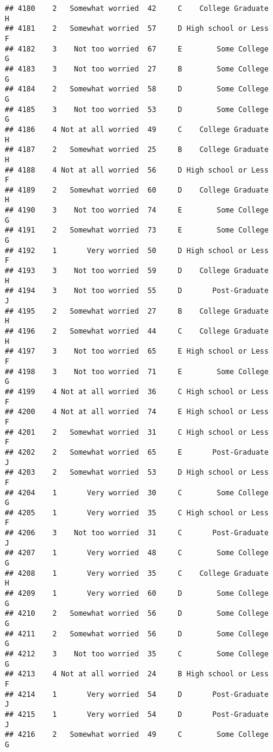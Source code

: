 \documentclass[
]{article}
\begin{document}
\begin{verbatim}
## 4180    2   Somewhat worried  42     C    College Graduate         H
## 4181    2   Somewhat worried  57     D High school or Less         F
## 4182    3    Not too worried  67     E        Some College         G
## 4183    3    Not too worried  27     B        Some College         G
## 4184    2   Somewhat worried  58     D        Some College         G
## 4185    3    Not too worried  53     D        Some College         G
## 4186    4 Not at all worried  49     C    College Graduate         H
## 4187    2   Somewhat worried  25     B    College Graduate         H
## 4188    4 Not at all worried  56     D High school or Less         F
## 4189    2   Somewhat worried  60     D    College Graduate         H
## 4190    3    Not too worried  74     E        Some College         G
## 4191    2   Somewhat worried  73     E        Some College         G
## 4192    1       Very worried  50     D High school or Less         F
## 4193    3    Not too worried  59     D    College Graduate         H
## 4194    3    Not too worried  55     D       Post-Graduate         J
## 4195    2   Somewhat worried  27     B    College Graduate         H
## 4196    2   Somewhat worried  44     C    College Graduate         H
## 4197    3    Not too worried  65     E High school or Less         F
## 4198    3    Not too worried  71     E        Some College         G
## 4199    4 Not at all worried  36     C High school or Less         F
## 4200    4 Not at all worried  74     E High school or Less         F
## 4201    2   Somewhat worried  31     C High school or Less         F
## 4202    2   Somewhat worried  65     E       Post-Graduate         J
## 4203    2   Somewhat worried  53     D High school or Less         F
## 4204    1       Very worried  30     C        Some College         G
## 4205    1       Very worried  35     C High school or Less         F
## 4206    3    Not too worried  31     C       Post-Graduate         J
## 4207    1       Very worried  48     C        Some College         G
## 4208    1       Very worried  35     C    College Graduate         H
## 4209    1       Very worried  60     D        Some College         G
## 4210    2   Somewhat worried  56     D        Some College         G
## 4211    2   Somewhat worried  56     D        Some College         G
## 4212    3    Not too worried  35     C        Some College         G
## 4213    4 Not at all worried  24     B High school or Less         F
## 4214    1       Very worried  54     D       Post-Graduate         J
## 4215    1       Very worried  54     D       Post-Graduate         J
## 4216    2   Somewhat worried  49     C        Some College         G

\end{verbatim}
\end{document}

